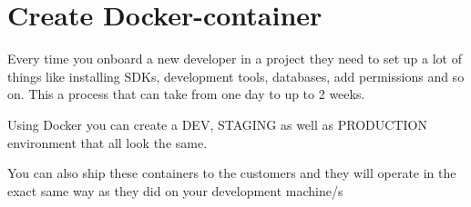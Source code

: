 \section{Create Docker-container}

Every time you onboard a new developer in a project they need to set up a lot of
things like installing SDKs, development tools, databases, add permissions and
so on. This a process that can take from one day to up to 2 weeks.

Using Docker you can create a DEV, STAGING as well as PRODUCTION environment
that all look the same.

You can also ship these containers to the customers and they will operate in the
exact same way as they did on your development machine/s

